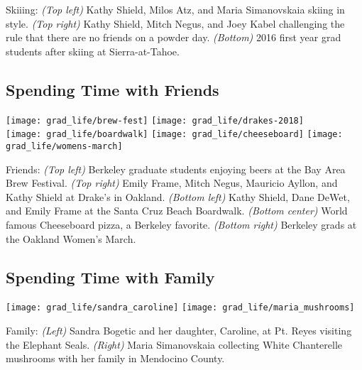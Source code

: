 Skiiing: 
\textit{(Top left)} Kathy Shield, Milos Atz, and Maria Simanovskaia skiing in style. 
\textit{(Top right)} Kathy Shield, Mitch Negus, and Joey Kabel challenging the rule that there are no friends on a powder day. 
\textit{(Bottom)} 2016 first year grad students after skiing at Sierra-at-Tahoe.


\subsection*{Spending Time with Friends}

\begin{minipage}{\textwidth}
  \begin{center}
    \texttt{[image: grad\_life/brew-fest]}
    \texttt{[image: grad\_life/drakes-2018]}\\
    \vspace{0.2cm}
    \texttt{[image: grad\_life/boardwalk]}
    \texttt{[image: grad\_life/cheeseboard]}
	\texttt{[image: grad\_life/womens-march]}
  \end{center}
\end{minipage}

Friends: 
\textit{(Top left)} Berkeley graduate students enjoying beers at the Bay Area Brew Festival.
\textit{(Top right)} Emily Frame, Mitch Negus, Mauricio Ayllon, and Kathy Shield at Drake's in Oakland.
\textit{(Bottom left)} Kathy Shield, Dane DeWet, and Emily Frame at the Santa Cruz Beach Boardwalk.
\textit{(Bottom center)} World famous Cheeseboard pizza, a Berkeley favorite.
\textit{(Bottom right)} Berkeley grads at the Oakland Women’s March.


\subsection*{Spending Time with Family}

\begin{minipage}{\textwidth}
  \begin{center}
    \texttt{[image: grad\_life/sandra\_caroline]}
    \texttt{[image: grad\_life/maria\_mushrooms]}\\
  \end{center}
\end{minipage}

Family:
\textit{(Left)} Sandra Bogetic and her daughter, Caroline, at Pt. Reyes visiting the Elephant Seals.
\textit{(Right)} Maria Simanovskaia collecting White Chanterelle mushrooms with her family in Mendocino County.
